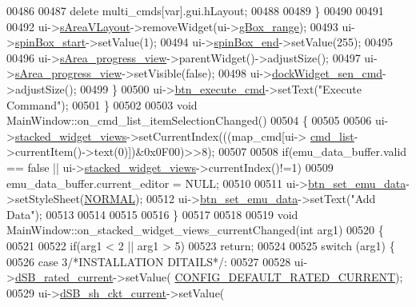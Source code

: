 \begin{DoxyCode}
00486 
00487             \textcolor{keyword}{delete} multi\_cmds[var].gui.hLayout;
00488 
00489         \}
00490 
00491 
00492     ui->\hyperlink{a00027_a2bdce9ad313cd4ee575613f36cbc4678}{sAreaVLayout}->removeWidget(ui->\hyperlink{a00027_a3c12d0504a310784c3820d1a9ad469c2}{gBox\_range});
00493     ui->\hyperlink{a00027_acb4d6609c580645dac5aee1f1ad59d01}{spinBox\_start}->setValue(1);
00494     ui->\hyperlink{a00027_a8ebeb5caa10878d7806d1f548913b449}{spinBox\_end}->setValue(255);
00495 
00496     ui->\hyperlink{a00027_ae4fe44aa026dd0e84e0f10cdcabca504}{sArea\_progress\_view}->parentWidget()->adjustSize();
00497     ui->\hyperlink{a00027_ae4fe44aa026dd0e84e0f10cdcabca504}{sArea\_progress\_view}->setVisible(\textcolor{keyword}{false});
00498     ui->\hyperlink{a00027_a9eb86a5ee396766f0f4a65f2d2bd7688}{dockWidget\_sen\_cmd}->adjustSize();
00499     \}
00500     ui->\hyperlink{a00027_a9ea50d44e38316e4203933698cbc14a6}{btn\_execute\_cmd}->setText(\textcolor{stringliteral}{"Execute Command"});
00501 \}
00502 
00503 \textcolor{keywordtype}{void} MainWindow::on\_cmd\_list\_itemSelectionChanged()
00504 \{
00505 
00506     ui->\hyperlink{a00027_a59e39bd3d716004e840a5be5dda18b96}{stacked\_widget\_views}->setCurrentIndex(((map\_cmd[ui->
      \hyperlink{a00027_aa66ece71395b435e915d384fb63bac1d}{cmd\_list}->currentItem()->text(0)])&0x0F00)>>8);
00507 
00508     \textcolor{keywordflow}{if}(emu\_data\_buffer.valid == \textcolor{keyword}{false} || ui->\hyperlink{a00027_a59e39bd3d716004e840a5be5dda18b96}{stacked\_widget\_views}->currentIndex()!=1)
00509     emu\_data\_buffer.current\_editor = NULL;
00510 
00511     ui->\hyperlink{a00027_ad05944ce9c8afb0ab60549a326b8e0af}{btn\_set\_emu\_data}->setStyleSheet(\hyperlink{a00034_a1291f416b069313021b519eea62d5bf1}{NORMAL});
00512     ui->\hyperlink{a00027_ad05944ce9c8afb0ab60549a326b8e0af}{btn\_set\_emu\_data}->setText(\textcolor{stringliteral}{"Add Data"});
00513 
00514 
00515 
00516 \}
00517 
00518 
00519 \textcolor{keywordtype}{void} MainWindow::on\_stacked\_widget\_views\_currentChanged(\textcolor{keywordtype}{int} arg1)
00520 \{
00521 
00522     \textcolor{keywordflow}{if}(arg1 < 2 || arg1 > 5)
00523         \textcolor{keywordflow}{return};
00524 
00525     \textcolor{keywordflow}{switch} (arg1) \{
00526         \textcolor{keywordflow}{case} 3\textcolor{comment}{/*INSTALLATION DITAILS*/}:
00527 
00528              ui->\hyperlink{a00027_ab6d7c3a292c79cd73aff8735df48d30e}{dSB\_rated\_current}->setValue(
      \hyperlink{a00031_ae329eb408f386777cbb443c27ca7c1c5}{CONFIG\_DEFAULT\_RATED\_CURRENT});
00529              ui->\hyperlink{a00027_aab5fcfd5ceedb9c4e853139113f5c753}{dSB\_sh\_ckt\_current}->setValue(

\end{DoxyCode}
